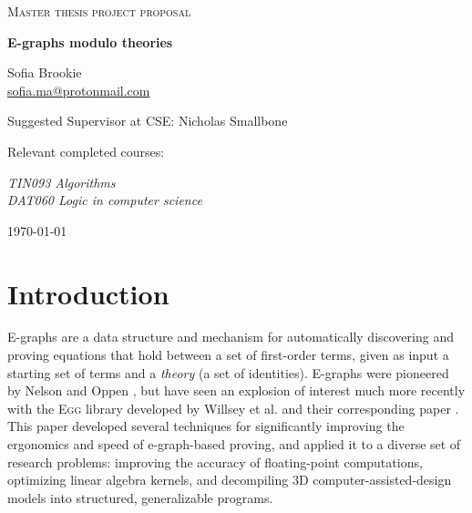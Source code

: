 \documentclass{article}
\begin{document}
\begin{titlepage}

\centering
  
{\scshape\LARGE Master thesis project proposal\\}
  
\vspace{0.5cm}
  
{\huge\bfseries E-graphs modulo theories\\}
  
\vspace{2cm}
  
{\Large Sofia Brookie \\ \href{mailto:sofia.ma@protonmail.com}{sofia.ma@protonmail.com} \\}
  
\vspace{1.0cm}
  
{\large Suggested Supervisor at CSE: Nicholas Smallbone\\}
  
\vspace{1.5cm}
  
{\large Relevant completed courses:\par}
  
{\itshape TIN093 Algorithms \\  DAT060 Logic in computer science \\}
  
\vfill

\vfill
  
{\large \today\\} 

\end{titlepage}

\section{Introduction}
E-graphs are a data structure and mechanism for automatically discovering and proving equations that hold
between a set of first-order terms, given as input a starting set of terms and a \textit{theory} (a set of identities). E-graphs were pioneered by Nelson and Oppen \cite{nelson1980fast}, but have seen an explosion of interest much more recently with the \textsc{Egg} library developed by Willsey et al. and their corresponding paper \cite{willsey2021egg}. This paper developed several techniques for
significantly improving the ergonomics and speed of e-graph-based proving, and applied it
to a diverse set of research problems: improving the accuracy of floating-point computations, optimizing linear algebra kernels, and decompiling 3D computer-assisted-design models into structured, generalizable programs.
\end{document}
